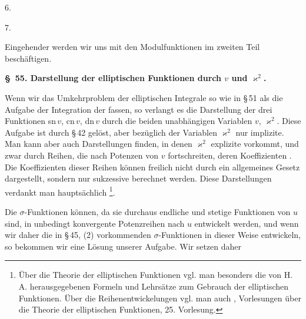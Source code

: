 6.  %

7. 

Eingehender werden wir uns mit den Modulfunktionen im zweiten Teil beschäftigen.

\begin{center}
\textbf{\S\ 55. Darstellung der elliptischen Funktionen durch $v$ und $\varkappa^2$.}
\end{center}

Wenn wir das Umkehrproblem der elliptischen Integrale so wie in \S\,51 als die Aufgabe der Integration der  fassen, so verlangt es die Darstellung der drei Funktionen sn\,$v$, cn\,$v$, dn\,$v$ durch die beiden unabhängigen Variablen $v$, $\varkappa^2$. Diese Aufgabe ist durch \S\,42 gelöst, aber bezüglich der Variablen $\varkappa^2$ nur implizite. Man kann aber auch Darstellungen finden, in denen $\varkappa^2$ explizite vorkommt, und zwar durch Reihen, die nach Potenzen von $v$ fortschreiten, deren Koeffizienten . Die Koeffizienten dieser Reihen können freilich nicht durch ein allgemeines Gesetz dargestellt, sondern nur sukzessive berechnet werden. Diese Darstellungen verdankt man hauptsächlich \footnote{Über die  Theorie der elliptischen Funktionen vgl. man besonders die von H.\,A.  herausgegebenen \glqq Formeln und Lehrsätze zum Gebrauch der elliptischen Funktionen\grqq. Über die Reihenentwickelungen vgl. man auch , \glqq Vorlesungen über die Theorie der elliptischen Funktionen\grqq, 25. Vorlesung.}.

Die $\sigma$-Funktionen können, da sie durchaus endliche und stetige Funktionen von $u$ sind, in unbedingt konvergente Potenzreihen nach $u$ entwickelt werden, und wenn wir daher die in \S\,45, (2) vorkommenden $\sigma$-Funktionen in dieser Weise entwickeln, so bekommen wir eine Lösung unserer Aufgabe. Wir setzen daher
